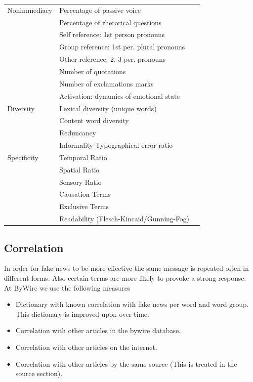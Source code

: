 \documentclass[10pt, a4paper, twocolumn]{article} %
\begin{document}
\begin{table}
\begin{tabular}{llr}
		 Nonimmediacy  & Percentage of passive voice             &  \\
		               & Percentage of rhetorical questions      &  \\
		               & Self reference: 1st person pronouns     &  \\
		               & Group reference: 1st per. plural pronouns &  \\
		               & Other reference: 2, 3 per. pronouns     &  \\
		               & Number of quotations                    &  \\
		               & Number of exclamations marks            &  \\
		               & Activation: dynamics of emotional state &  \\
		 Diversity     & Lexical diversity (unique words)        &  \\
                               & Content word diversity                  &  \\
                               & Reduncancy                              &  \\
                               & Informality Typographical error ratio   &  \\
                 Specificity   & Temporal Ratio                          &  \\
                               & Spatial Ratio                           &  \\
                               & Sensory Ratio                           &  \\
                               & Causation Terms                         &  \\
                               & Exclusive Terms                         &  \\
                               & Readability (Flesch-Kincaid/Gunning-Fog) &  \\
		\bottomrule
	\end{tabular}
\end{table}

\subsection{Correlation}
In order for fake news to be more effective the same message is repeated often in different forms.
Also certain terms are more likely to provoke a strong response. At ByWire we use the following measures
\begin{itemize}
\item Dictionary with known correlation with fake news per word and word group. This dictionary is improved upon over time.
\item Correlation with other articles in the bywire database.
\item Correlation with other articles on the internet.
\item Correlation with other articles by the same source (This is treated in the source section).
\end{itemize}
\end{document}
